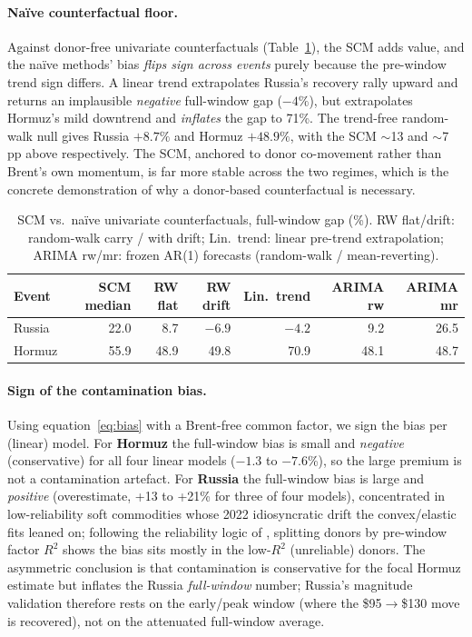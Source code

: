 \documentclass[11pt,a4paper]{article}
\begin{document}
\paragraph{Na\"ive counterfactual floor.} Against donor-free univariate counterfactuals
(Table~\ref{tab:naive}), the SCM adds value, and the na\"ive methods' bias \emph{flips
sign across events} purely because the pre-window trend sign differs. A linear trend
extrapolates Russia's recovery rally upward and returns an implausible \emph{negative}
full-window gap ($-4\%$), but extrapolates Hormuz's mild downtrend and \emph{inflates} the
gap to 71\%. The trend-free random-walk null gives Russia $+8.7\%$ and Hormuz $+48.9\%$,
with the SCM $\sim$13 and $\sim$7 pp above respectively. The SCM, anchored to donor
co-movement rather than Brent's own momentum, is far more stable across the two regimes,
which is the concrete demonstration of why a donor-based counterfactual is necessary.

\begin{table}[h]
\centering
\caption{SCM vs.\ na\"ive univariate counterfactuals, full-window gap (\%). RW flat/drift:
random-walk carry / with drift; Lin.\ trend: linear pre-trend extrapolation; ARIMA rw/mr:
frozen AR(1) forecasts (random-walk / mean-reverting).}
\label{tab:naive}
\small
\begin{tabular}{@{}lrrrrrr@{}}
\toprule
Event & SCM median & RW flat & RW drift & Lin.\ trend & ARIMA rw & ARIMA mr \\
\midrule
Russia & 22.0 & 8.7  & $-6.9$ & $-4.2$ & 9.2  & 26.5 \\
Hormuz & 55.9 & 48.9 & 49.8   & 70.9   & 48.1 & 48.7 \\
\bottomrule
\end{tabular}
\end{table}

\paragraph{Sign of the contamination bias.} Using equation~\eqref{eq:bias} with a
Brent-free common factor, we sign the bias per (linear) model. For \textbf{Hormuz} the
full-window bias is small and \emph{negative} (conservative) for all four linear models
($-1.3$ to $-7.6$\%), so the large premium is not a contamination artefact. For
\textbf{Russia} the full-window bias is large and \emph{positive} (overestimate, +13 to
+21\% for three of four models), concentrated in low-reliability soft commodities whose
2022 idiosyncratic drift the convex/elastic fits leaned on; following the reliability logic
of \citet{hammiratrix2024}, splitting donors by pre-window factor $R^2$ shows the bias sits
mostly in the low-$R^2$ (unreliable) donors. The asymmetric conclusion is that
contamination is conservative for the focal Hormuz estimate but inflates the Russia
\emph{full-window} number; Russia's magnitude validation therefore rests on the early/peak
window (where the \$95$\to$\$130 move is recovered), not on the attenuated full-window
average.
\end{document}
